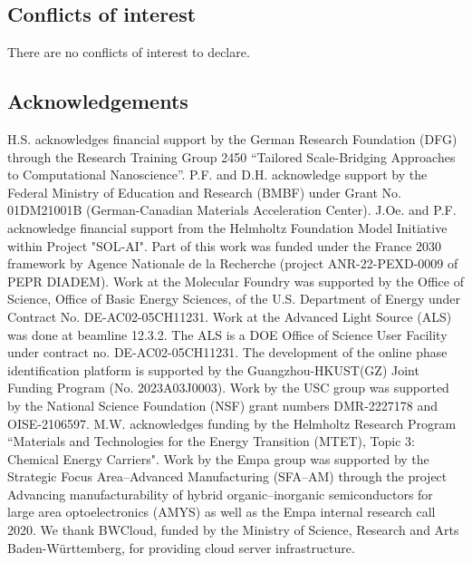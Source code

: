 \documentclass[a4paper]{article}
\begin{document}
\subsection*{Conflicts of interest}
There are no conflicts of interest to declare.

\subsection*{Acknowledgements}
H.S. acknowledges financial support by the German Research Foundation (DFG) through the Research Training Group 2450 “Tailored Scale-Bridging Approaches to Computational Nanoscience”. P.F. and D.H. acknowledge support by the Federal Ministry of Education and Research (BMBF) under Grant No. 01DM21001B (German-Canadian Materials Acceleration Center). J.Oe. and P.F. acknowledge financial support from the Helmholtz Foundation Model Initiative within Project "SOL-AI". Part of this work was funded under the France 2030 framework by Agence Nationale de la Recherche (project ANR-22-PEXD-0009 of PEPR DIADEM). Work at the Molecular Foundry was supported by the Office of Science, Office of Basic Energy Sciences, of the U.S. Department of Energy under Contract No. DE-AC02-05CH11231. Work at the Advanced Light Source (ALS) was done at beamline 12.3.2. The ALS is a DOE Office of Science User Facility under contract no. DE-AC02-05CH11231. The development of the online phase identification platform is supported by the Guangzhou-HKUST(GZ) Joint Funding Program (No. 2023A03J0003). Work by the USC group was supported by the National Science Foundation (NSF) grant numbers DMR-2227178 and OISE-2106597. M.W. acknowledges funding by the Helmholtz Research Program “Materials and Technologies for the Energy Transition (MTET), Topic 3: Chemical Energy Carriers". Work by the Empa group was supported by the Strategic Focus Area–Advanced Manufacturing (SFA–AM) through the project Advancing manufacturability of hybrid organic–inorganic semiconductors for large area optoelectronics (AMYS) as well as the Empa internal research call 2020. We thank BWCloud, funded by the Ministry of Science, Research and Arts Baden-Württemberg, for providing cloud server infrastructure.

\clearpage
\end{document}
